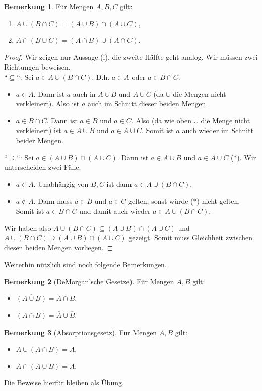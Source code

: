 \documentclass[11pt, a4paper]{article}
\theoremstyle{definition}
\newtheorem*{remark*}{Bemerkung}
\theoremstyle{plain}
\numberwithin{equation}{section}
\newcommand{\comp}[1]{\overline{#1}}
\begin{document}
\begin{remark*}
	Für Mengen $A, B, C$ gilt:
	\begin{enumerate}
		\item $A \cup (B \cap C) = (A \cup B) \cap (A \cup C)$,
		\item $A \cap (B \cup C) = (A \cap B) \cup (A \cap C)$.
	\end{enumerate}
	\begin{proof}
		Wir zeigen nur Aussage (i), die zweite Hälfte geht analog. Wir müssen zwei Richtungen beweisen.\\
		``$\subseteq$``: Sei $a \in A \cup (B \cap C)$. D.h. $a \in A$ oder $a \in B \cap C$.
		\begin{itemize}
			\item $a \in A$. Dann ist $a$ auch in $A \cup B$ und $A \cup C$ (da $\cup$ die Mengen nicht verkleinert). Also ist $a$ auch im Schnitt dieser beiden Mengen.
			\item $a \in B \cap C$. Dann ist $a \in B$ und $a \in C$. Also (da wie oben $\cup$ die Menge nicht verkleinert) ist $a \in A \cup B$ und $a \in A \cup C$. Somit ist $a$ auch wieder im Schnitt beider Mengen.
		\end{itemize}
		``$\supseteq$``: Sei $a \in (A \cup B) \cap (A \cup C)$. Dann ist $a \in A \cup B$ und $a \in A \cup C$ ($\ast$). Wir unterscheiden zwei Fälle:
		\begin{itemize}
			\item $a \in A$. Unabhängig von $B, C$ ist dann $a \in A \cup (B \cap C)$.
			\item $a \notin A$. Dann muss $a \in B$ und $a \in C$ gelten, sonst würde ($\ast$) nicht gelten. Somit ist $a \in B \cap C$ und damit auch wieder $a \in A \cup (B \cap C)$. 
		\end{itemize}
		Wir haben also $A \cup (B \cap C) \subseteq (A \cup B) \cap (A \cup C)$ und $A \cup (B \cap C) \supseteq (A \cup B) \cap (A \cup C)$ gezeigt. Somit muss Gleichheit zwischen diesen beiden Mengen vorliegen.
	\end{proof}
\end{remark*}
Weiterhin nützlich sind noch folgende Bemerkungen.
\begin{remark*}[DeMorgan'sche Gesetze]
	Für Mengen $A, B$ gilt:
	\begin{itemize}
		\item $\comp{(A \cup B)} = \comp{A} \cap \comp{B}$,
		\item $\comp{(A \cap B)} = \comp{A} \cup \comp{B}$.
	\end{itemize}
\end{remark*}
\begin{remark*}[Absorptionsgesetz]
	Für Mengen $A, B$ gilt:
	\begin{itemize}
		\item $A \cup (A \cap B) = A$,
		\item $A \cap (A \cup B) = A$.
	\end{itemize}
\end{remark*}
Die Beweise hierfür bleiben als Übung.
\end{document}
